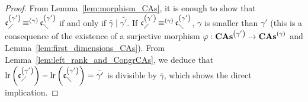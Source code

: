 \begin{proof}
    From Lemma~\ref{lem:morphism_CAs}, it is enough to show that
    $\mathfrak{c}^{\left(\gamma'\right)}_{\diagup} \operatorname{\equiv}^{(\gamma)} \mathfrak{c}^{\left(\gamma'\right)}_{\diagdown}$ if and only if
    $\bar{\gamma} \mid \bar{\gamma'}$. If
    $\mathfrak{c}^{\left(\gamma'\right)}_{\diagup}\operatorname{\equiv}^{(\gamma)}\mathfrak{c}^{\left(\gamma'\right)}_{\diagdown}$, $\gamma$ is
    smaller than $\gamma'$ (this is a consequence of the existence of a
    surjective morphism $\varphi:\mathbf{CAs}^{\left(\gamma'\right)} \to \mathbf{CAs}^{\left(\gamma\right)}$ and
    Lemma~\ref{lem:first_dimensions_CAs}). From
    Lemma~\ref{lem:left_rank_and_CongrCAs}, we deduce that
    \begin{math}
        \mathrm{lr}\left(\mathfrak{c}^{\left(\gamma'\right)}_{\diagup}\right)
        - \mathrm{lr}\left(\mathfrak{c}^{\left(\gamma'\right)}_{\diagdown}\right)
        = \bar{\gamma'}
    \end{math}
    is divisible by $\bar{\gamma}$, which shows the direct implication.
    \smallbreak


\end{proof}
